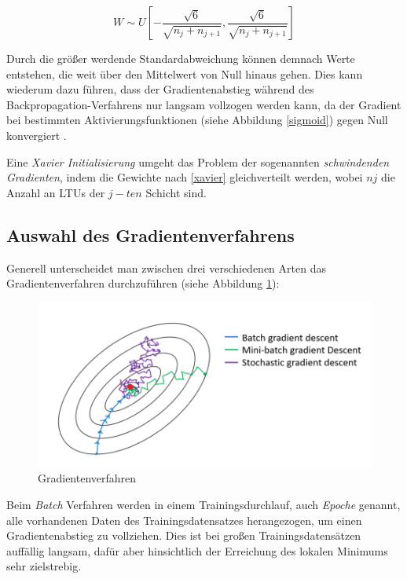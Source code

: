 \begin{equation} \label{xavier}
W \sim U[-\frac{\sqrt{6}}{\sqrt{n_{j} + n_{j+1}}},\frac{\sqrt{6}}{\sqrt{n_{j} + n_{j+1}}}]
\end{equation}

Durch die größer werdende Standardabweichung können demnach Werte entstehen, die weit über den Mittelwert von Null hinaus gehen. Dies kann wiederum dazu führen, dass der Gradientenabstieg während des Backpropagation-Verfahrens nur langsam vollzogen werden kann, da der Gradient bei bestimmten Aktivierungsfunktionen (siehe Abbildung \ref{sigmoid}) gegen Null konvergiert \cite[S. 275 f.]{AurelienGeron.2018}. 

Eine \textit{Xavier Initialisierung} umgeht das Problem der sogenannten \textit{schwindenden Gradienten}, indem die Gewichte nach \ref{xavier} gleichverteilt werden, wobei $n{j}$ die Anzahl an LTUs der $j-ten$ Schicht sind. \cite[S. 253]{XavierGlorot.2010}

\subsection*{Auswahl des Gradientenverfahrens}

Generell unterscheidet man zwischen drei verschiedenen Arten das Gradientenverfahren durchzuführen (siehe Abbildung \ref{gradient}):

\begin{figure}[ht]
	\begin{center}
		\includegraphics[width=16cm]{Bilder/gradient_descent.png} 
		\caption[Gradientenverfahren]{Gradientenverfahren \cite{ImadDabbura.20171221}}
		\label{gradient}
	\end{center}
\end{figure}

Beim \textit{Batch} Verfahren werden in einem Trainingsdurchlauf, auch \textit{Epoche} genannt, alle vorhandenen Daten des Trainingsdatensatzes herangezogen, um einen Gradientenabstieg zu vollziehen. Dies ist bei großen Trainingsdatensätzen auffällig langsam, dafür aber hinsichtlich der Erreichung des lokalen Minimums sehr zielstrebig. \cite[S. 116]{AurelienGeron.2018}

